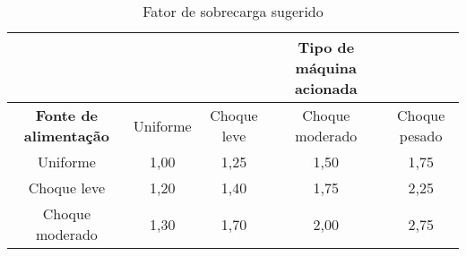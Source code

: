 \begin{table}[]
\centering
\caption{\label{tab:1} Fator de sobrecarga sugerido}
\begin{tabular}{c c c c c} 
\hline
&&&\textbf{Tipo de máquina acionada} \\ \hline
\textbf{Fonte de alimentação}     & {Uniforme}     & {Choque leve}      &{Choque moderado}  &{Choque pesado} \\ \hline
\multicolumn{1}{c}{Uniforme}    & \multicolumn{1}{c}{1,00} & \multicolumn{1}{c}{1,25} & \multicolumn{1}{c}{1,50} & \multicolumn{1}{c}{1,75} \\ \hline
\multicolumn{1}{c}{Choque leve} & \multicolumn{1}{c}{1,20} & \multicolumn{1}{c}{1,40} & \multicolumn{1}{c}{1,75} & \multicolumn{1}{c}{2,25} \\ \hline
Choque moderado             & 1,30                & 1,70                & 2,00             & 2,75            \\ \hline
\end{tabular}
\end{table}